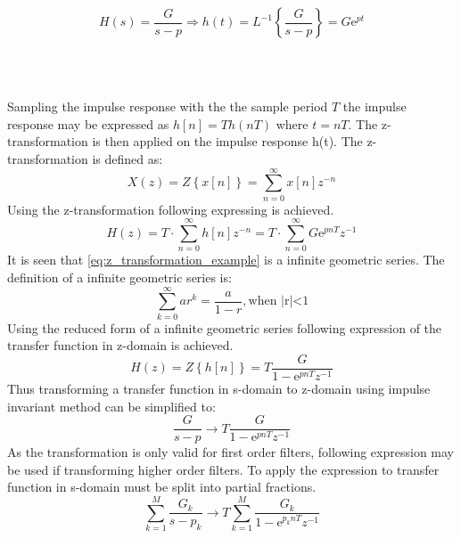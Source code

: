 \begin{equation}
H(s) = \frac{G}{s-p} \Rightarrow h(t) = L^{-1}\left\lbrace \frac{G}{s-p} \right\rbrace = G\text{e}^{pt}
\end{equation}
\begin{where}
\\
\\
\end{where}

Sampling the impulse response with the the sample period $T$ the impulse response may be expressed as $h[n] = Th(nT)$ where $t = nT$. The z-transformation is then applied on the impulse response h(t). The z-transformation is defined as:
\begin{equation}
X(z) = Z \left\lbrace x[n] \right\rbrace = \sum_{n=0}^{\infty}x[n]z^{-n}
\end{equation}
Using the z-transformation following expressing is achieved.
\begin{equation} \label{eq:z_transformation_example}
H(z) = T\cdot \sum_{n=0}^{\infty}h[n]z^{-n} = T\cdot \sum_{n=0}^{\infty}G\text{e}^{pnT}z^{-1}
\end{equation}
It is seen that \autoref{eq:z_transformation_example} is a infinite geometric series. The definition of a infinite geometric series is:
\begin{equation} \label{eq:z_transformation_example}
\sum_{k=0}^{\infty}ar^k  = \frac{a}{1-r}, \text{when |r|<1}
\end{equation}
Using the reduced form of a infinite geometric series following expression of the transfer function in z-domain is achieved.
\begin{equation} \label{eq:z_transformation_example1}
H(z) = Z \left\lbrace h[n] \right\rbrace = T \frac{G}{1-\text{e}^{pnT}z^{-1}}
\end{equation}
Thus transforming a transfer function in s-domain to z-domain using impulse invariant method can be simplified to:
\begin{equation} \label{eq:z_transformation_example2}
\frac{G}{s-p} \rightarrow T\frac{G}{1-\text{e}^{pnT}z^{-1}}
\end{equation}
As the transformation is only valid for first order filters, following expression may be used if transforming higher order filters. To apply the expression to transfer function in s-domain must be split into partial fractions.
\begin{equation} \label{eq:z_transformation_example3}
\sum_{k=1}^{M} \frac{G_k}{s-p_k} \rightarrow T \sum_{k=1}^{M} \frac{G_k}{1-\text{e}^{p_knT}z^{-1}}
\end{equation}

